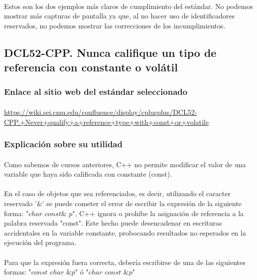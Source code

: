 			\paragraph{}Estos son los dos ejemplos más claros de cumplimiento del estándar. No podemos mostrar más capturas de pantalla ya que, al no hacer uso de identificadores reservados, no podemos mostrar las correcciones de los incumplimientos.

	\subsection{DCL52-CPP. Nunca califique un tipo de referencia con constante o volátil}
	
		\subsubsection{Enlace al sitio web del estándar seleccionado}
		
			\paragraph{}\url{https://wiki.sei.cmu.edu/confluence/display/cplusplus/DCL52-CPP.+Never+qualify+a+reference+type+with+const+or+volatile}
		
		\subsubsection{Explicación sobre su utilidad}
		
			\paragraph{}Como sabemos de cursos anteriores, C++ no permite modificar el valor de una variable que haya sido calificada con constante (const). 
			
			\paragraph{}En el caso de objetos que sea referenciados, es decir, utilizando el caracter reservado '$\&$' se puede cometer el error de escribir la expresión de la siguiente forma: "$char$ $const\&$ $p$", C++ ignora o prohibe la asignación de referencia a la palabra reservada "const". Este hecho puede desencadenar en escrituras accidentales en la variable constante, probocando resultados no esperados en la ejecución del programa.
			
			\paragraph{}Para que la expresión fuera correcta, debería escribirse de una de las siguientes formas: "$const$ $char$ $\&p$" ó "$char$ $const$ $\&p$"
		
